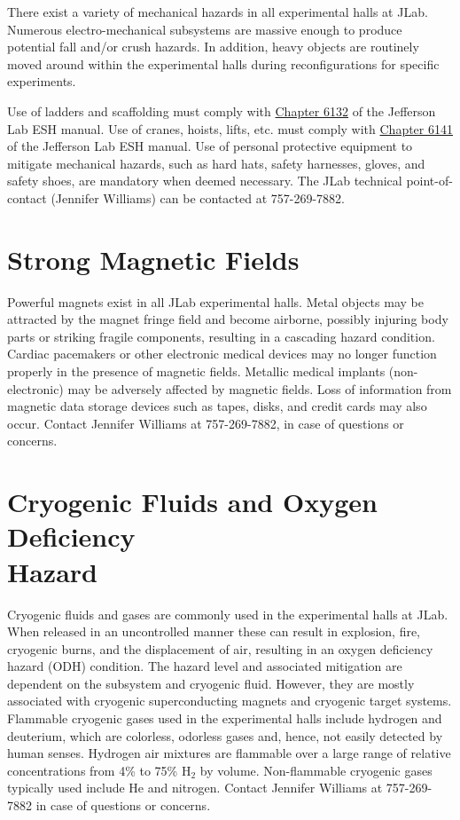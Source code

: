 \documentclass[11pt]{report}
\begin{document}
There exist a variety of mechanical hazards in all experimental halls at JLab. Numerous 
electro-mechanical subsystems are massive enough to produce potential fall and/or crush 
hazards.  In addition, heavy objects are routinely moved around within the experimental 
halls during reconfigurations for specific experiments. 

Use of ladders and scaffolding must comply with 
\href{http://www.jlab.org/ESH/ESHmanual/manual/6132.html}{Chapter 6132} of the Jefferson 
Lab ESH manual. Use of cranes, hoists, lifts, etc. must comply with
\href{http://www.jlab.org/ESH/ESHmanual/manual/6141.html}{Chapter 6141} of the Jefferson
Lab ESH manual. Use of personal protective equipment to mitigate mechanical hazards, 
such as hard hats, safety harnesses, gloves, and safety shoes, are mandatory when deemed necessary.
The JLab technical point-of-contact (Jennifer Williams) can be contacted at 757-269-7882.

\section{Strong Magnetic Fields}

Powerful magnets exist in all JLab experimental halls. Metal objects may be attracted 
by the magnet fringe field and become airborne, possibly injuring body parts or striking 
fragile components, resulting in a cascading hazard condition. Cardiac pacemakers or other 
electronic medical devices may no longer function properly in the presence of magnetic 
fields. Metallic medical implants (non-electronic) may be adversely affected by magnetic 
fields. Loss of information from magnetic data storage devices such as tapes, disks, and 
credit cards may also occur. Contact Jennifer Williams at 757-269-7882, in case of questions 
or concerns.

\section{Cryogenic Fluids and Oxygen Deficiency \\Hazard}

Cryogenic fluids and gases are commonly used in the experimental halls at JLab. When 
released in an uncontrolled manner these can result in explosion, fire, cryogenic burns, 
and the displacement of air, resulting in an oxygen deficiency hazard (ODH) condition. 
The hazard level and associated mitigation are dependent on the subsystem and cryogenic 
fluid. However, they are mostly associated with cryogenic superconducting magnets and 
cryogenic target systems. Flammable cryogenic gases used in the experimental halls 
include hydrogen and deuterium, which are colorless, odorless gases and, hence, not easily 
detected by human senses. Hydrogen air mixtures are flammable over a large range of relative 
concentrations from 4\% to 75\% H$_2$ by volume. Non-flammable cryogenic gases typically 
used include He and nitrogen. Contact Jennifer Williams at 757-269-7882 in case of questions or concerns.
\end{document}
